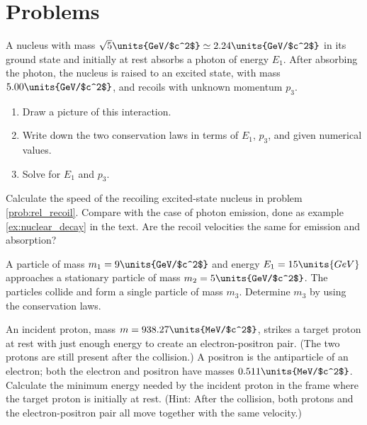 \newpage

\section*{Problems}


\begin{problem}
  A nucleus with mass $\sqrt{5}\units{GeV/$c^2$}\simeq 2.24\units{GeV/$c^2$}$ 
  in its ground state and initially at rest absorbs a photon of energy $E_1$.  
  After absorbing the photon, the nucleus is raised to an excited state, 
  with mass $5.00\units{GeV/$c^2$}$, and recoils with unknown momentum $p_3$.
  \begin{enumerate}
  \item Draw a picture of this interaction.
  \item Write down the two conservation laws in terms of $E_1$, $p_3$,
    and given numerical values.
  \item Solve for $E_1$ and $p_3$.
  \end{enumerate}
  \label{prob:rel_recoil}
\end{problem}

\begin{problem}
  Calculate the speed of the recoiling excited-state nucleus in
  problem \ref{prob:rel_recoil}.  Compare with the case of photon
  emission, done as example \ref{ex:nuclear_decay} in the text.  Are
  the recoil velocities the same for emission and absorption?
  \label{prob:rel_recoil2}
\end{problem}

\begin{problem}
  A particle of mass $m_1 = 9\units{GeV/$c^2$}$ and energy $E_1 =
  15\units{GeV}$ approaches a stationary particle of mass $m_2 =
  5\units{GeV/$c^2$}$.  The particles collide and form a single
  particle of mass $m_3$.  Determine $m_3$ by using the conservation
  laws.
\end{problem}

\begin{problem}
  An incident proton, mass $m = 938.27\units{MeV/$c^2$}$, strikes a
  target proton at rest with just enough energy to create an
  electron-positron pair.  (The two protons are still present after
  the collision.)  A positron is the antiparticle of an electron; both
  the electron and positron have masses $0.511\units{MeV/$c^2$}$.
  Calculate the minimum energy needed by the incident proton in the
  frame where the target proton is initially at rest. (Hint: After the
  collision, both protons and the electron-positron pair all move
  together with the same velocity.)
\label{prob:pair_creation}
\end{problem}

